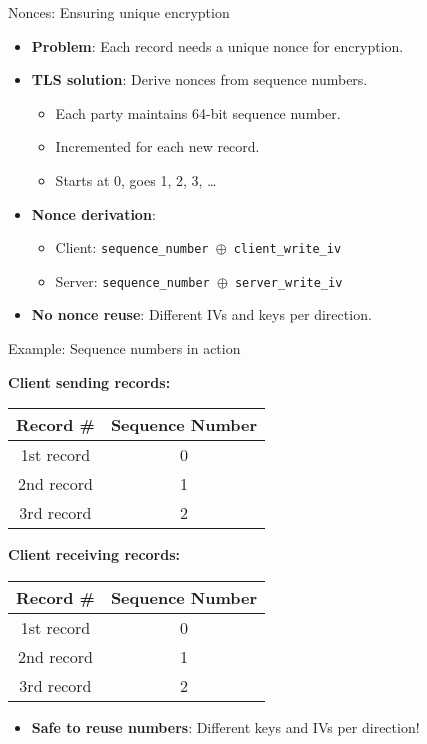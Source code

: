 \documentclass[aspectratio=169, lualatex, handout]{beamer}
\begin{document}
\begin{frame}{Nonces: Ensuring unique encryption}
	\begin{itemize}
		\item \textbf{Problem}: Each record needs a unique nonce for encryption.
		\item \textbf{TLS solution}: Derive nonces from sequence numbers.
		      \begin{itemize}
			      \item Each party maintains 64-bit sequence number.
			      \item Incremented for each new record.
			      \item Starts at 0, goes 1, 2, 3, \ldots
		      \end{itemize}
		\item \textbf{Nonce derivation}:
		      \begin{itemize}
			      \item Client: \texttt{sequence\_number $\oplus$ client\_write\_iv}
			      \item Server: \texttt{sequence\_number $\oplus$ server\_write\_iv}
		      \end{itemize}
		\item \textbf{No nonce reuse}: Different IVs and keys per direction.
	\end{itemize}
\end{frame}

\begin{frame}{Example: Sequence numbers in action}
	\begin{center}
		\textbf{Client sending records:}
		\begin{tabular}{|c|c|}
			\hline
			\textbf{Record \#} & \textbf{Sequence Number} \\
			\hline
			1st record         & 0                        \\
			\hline
			2nd record         & 1                        \\
			\hline
			3rd record         & 2                        \\
			\hline
		\end{tabular}
	\end{center}
	\pause
	\begin{center}
		\textbf{Client receiving records:}
		\begin{tabular}{|c|c|}
			\hline
			\textbf{Record \#} & \textbf{Sequence Number} \\
			\hline
			1st record         & 0                        \\
			\hline
			2nd record         & 1                        \\
			\hline
			3rd record         & 2                        \\
			\hline
		\end{tabular}
	\end{center}
	\pause
	\begin{itemize}
		\item \textbf{Safe to reuse numbers}: Different keys and IVs per direction!
	\end{itemize}
\end{frame}
\end{document}
